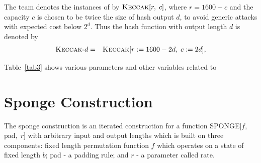 The \Keccak{} team denotes the instances of \Keccak{} by $\mbox{\textsc{Keccak}}[r,\;c]$, where $r=1600-c$ and the capacity $c$ is chosen to be twice the size of hash output $d$, to avoid generic attacks with expected cost below $2^d$. Thus the hash function with output length $d$ is denoted by 
\begin{eqnarray}
\mbox{\mbox{\textsc{Keccak}}-$d$}  &=& \mbox{\textsc{Keccak}}[r:=1600-2d,\;c:=2d],
\end{eqnarray}
\begin{table}
\begin{center}
\caption{Parameters and Symbols used in \KECCAK{}}\label{tab3}
\end{center}
\end{table}

Table~\ref{tab3} shows various parameters and other variables related to \KECCAK{}

\section{Sponge Construction}

The sponge construction is an iterated construction for a function SPONGE$[f,\; $pad$,\; r]$ with arbitrary input and output lengths which is built on three components: fixed length permutation function $f$ which operates on a state of fixed length $b$; pad - a padding rule; and $r$ 
- a parameter called rate.


